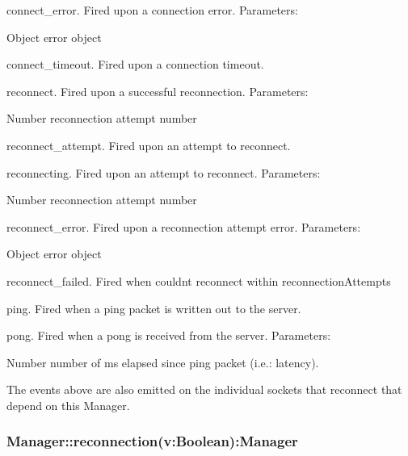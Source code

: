 \begin{DoxyItemize}
\item {\ttfamily connect\+\_\+error}. Fired upon a connection error. Parameters\+:
\begin{DoxyItemize}
\item {\ttfamily Object} error object
\end{DoxyItemize}
\item {\ttfamily connect\+\_\+timeout}. Fired upon a connection timeout.
\item {\ttfamily reconnect}. Fired upon a successful reconnection. Parameters\+:
\begin{DoxyItemize}
\item {\ttfamily Number} reconnection attempt number
\end{DoxyItemize}
\item {\ttfamily reconnect\+\_\+attempt}. Fired upon an attempt to reconnect.
\item {\ttfamily reconnecting}. Fired upon an attempt to reconnect. Parameters\+:
\begin{DoxyItemize}
\item {\ttfamily Number} reconnection attempt number
\end{DoxyItemize}
\item {\ttfamily reconnect\+\_\+error}. Fired upon a reconnection attempt error. Parameters\+:
\begin{DoxyItemize}
\item {\ttfamily Object} error object
\end{DoxyItemize}
\item {\ttfamily reconnect\+\_\+failed}. Fired when couldn\textquotesingle{}t reconnect within {\ttfamily reconnection\+Attempts}
\item {\ttfamily ping}. Fired when a ping packet is written out to the server.
\item {\ttfamily pong}. Fired when a pong is received from the server. Parameters\+:
\begin{DoxyItemize}
\item {\ttfamily Number} number of ms elapsed since {\ttfamily ping} packet (i.\+e.\+: latency).
\end{DoxyItemize}
\end{DoxyItemize}

The events above are also emitted on the individual sockets that reconnect that depend on this {\ttfamily Manager}.

\subsubsection*{Manager\+::reconnection(v\+:\+Boolean)\+:Manager}

